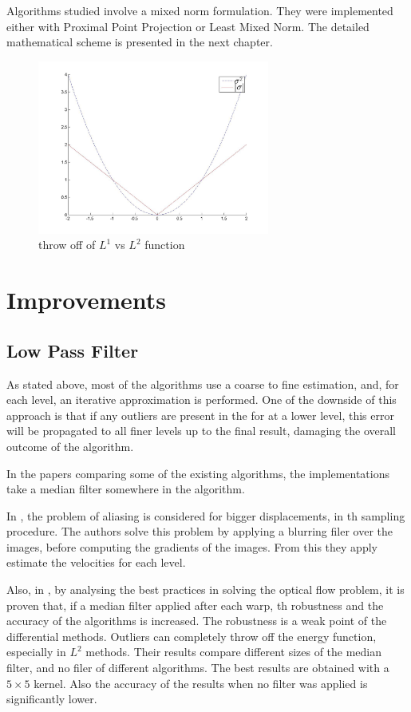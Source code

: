 \documentclass[12pt,a4paper,twoside]{report}
\begin{document}
Algorithms studied involve a mixed norm formulation. They were implemented either with Proximal Point Projection or Least Mixed Norm. The detailed mathematical scheme is presented in the next chapter.
\begin{figure} \label{func}
	\centering
	\includegraphics[width = 3in]{img/func} 
	\caption{  throw off of $L^1$ vs $L^2$ function }
\end{figure}
\section{Improvements}
\subsection{Low Pass Filter}

As stated above, most of the algorithms use a coarse to fine estimation, and, for each level, an iterative approximation is performed.
One of the downside of this approach is that if any outliers are present in the for at a lower level, this error will be propagated to all finer levels up to the final result, damaging the overall outcome of the algorithm.

In the papers comparing some of the existing algorithms, the implementations take a median filter somewhere in the algorithm.

In \cite{fleet2006}, the problem of aliasing is considered for bigger displacements, in th sampling procedure. The authors solve this problem by applying a blurring filer over the images, before computing the gradients of the images. From this they apply estimate the velocities for each level.

Also, in \cite{sun2010}, by analysing the best practices in solving the optical flow problem, it is proven that, if a median filter applied after each warp, th robustness and the accuracy of the algorithms is increased.
The robustness is a weak point of the differential methods. Outliers can completely throw off the energy function, especially in $L^2$ methods.
Their results compare different sizes of the median filter, and no filer of different algorithms. The best results are obtained with a $5 \times 5$ kernel. Also the accuracy of the results when no filter was applied is significantly lower.  
\end{document}
